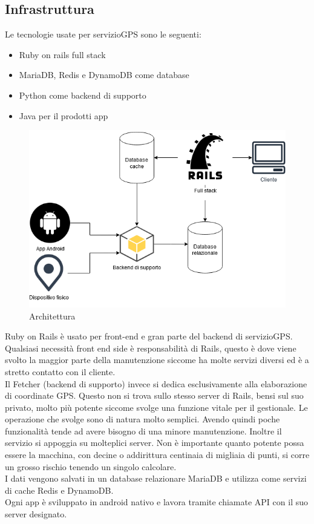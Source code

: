 \documentclass[12pt]{article}
\begin{document}
\subsection{Infrastruttura}
Le tecnologie usate per servizioGPS sono le seguenti:
\begin{itemize}
  \item Ruby on rails full stack
  \item MariaDB, Redis  e DynamoDB come database
  \item Python come backend di supporto
  \item Java per il prodotti app 
\end{itemize}
\begin{figure}[H]
\includegraphics[scale = 0.6]{infrastructure.png}
\caption{Architettura}
\end{figure}
Ruby on Rails è usato per front-end e gran parte del backend di servizioGPS. 
Qualsiasi necessità front end side è responsabilità di Rails, questo è dove 
viene svolto la maggior parte della manutenzione siccome ha molte servizi diversi 
ed è a stretto contatto con il cliente.
\\ Il Fetcher (backend di supporto) invece si dedica esclusivamente alla elaborazione
di coordinate GPS. 
Questo non si trova sullo stesso server di Rails, bensi sul suo privato, molto 
più potente siccome svolge una funzione vitale per il gestionale.
Le operazione che svolge sono di natura molto semplici. 
Avendo quindi poche funzionalità tende ad avere bisogno di una minore 
manutenzione.
Inoltre il servizio si appoggia su molteplici server. 
Non è importante quanto potente possa essere la macchina, con decine o addirittura 
centinaia di migliaia di punti, si corre un grosso rischio tenendo un singolo 
calcolare.
\\ I dati vengono salvati in un database relazionare MariaDB e utilizza come 
servizi di cache Redis e DynamoDB. 
\\ Ogni app è sviluppato in android nativo e lavora tramite chiamate API 
con il suo server designato. 
\end{document}
